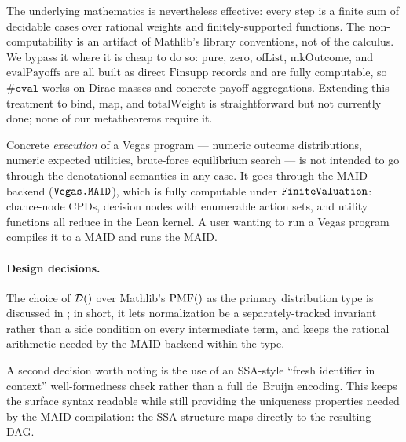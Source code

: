 \documentclass[11pt]{article}
\begin{document}
The underlying mathematics is nevertheless effective: every step is a
finite sum of decidable cases over rational weights and finitely-supported
functions. The non-computability is an artifact of Mathlib's library
conventions, not of the calculus. We bypass it where it is cheap to do so:
$\mathrm{pure}$, $\mathrm{zero}$, $\mathrm{ofList}$, $\mathrm{mkOutcome}$,
and $\mathrm{evalPayoffs}$ are all built as direct $\mathrm{Finsupp}$ records and
are fully computable, so $\mathtt{\#eval}$ works on Dirac masses and
concrete payoff aggregations. Extending this treatment to
$\mathrm{bind}$, $\mathrm{map}$, and $\mathrm{totalWeight}$ is
straightforward but not currently done; none of our metatheorems require
it.

Concrete \emph{execution} of a Vegas program --- numeric outcome
distributions, numeric expected utilities, brute-force equilibrium search
--- is not intended to go through the denotational semantics in any case.
It goes through the MAID backend ($\texttt{Vegas.MAID}$), which is fully
computable under $\texttt{FiniteValuation}$: chance-node CPDs, decision
nodes with enumerable action sets, and utility functions all reduce in the
Lean kernel. A user wanting to run a Vegas program compiles it to a MAID
and runs the MAID.

\paragraph{Design decisions.}
The choice of $\mathcal{D}()$ over Mathlib's $\mathrm{PMF}()$ as the primary
distribution type is discussed in ; in short, it lets
normalization be a separately-tracked invariant rather than a side
condition on every intermediate term, and keeps the rational arithmetic
needed by the MAID backend within the type.

A second decision worth noting is the use of an SSA-style ``fresh
identifier in context'' well-formedness check rather than a full
de~Bruijn encoding. This keeps the surface syntax readable while still
providing the uniqueness properties needed by the MAID compilation: the
SSA structure maps directly to the resulting DAG.
\end{document}
